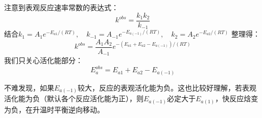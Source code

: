 \begin{example}
注意到表观反应速率常数的表达式：
$$k^{obs} = \frac{k_1 k_2}{k_{-1}}$$
结合$k_1 = A_1 e^{-E_{a1}/(RT)}, \quad k_{-1} = A_{-1} e^{-E_{a(-1)}/(RT)}, \quad k_2 = A_2 e^{-E_{a2}/(RT)} $
整理得：
$$k^{obs} = \frac{A_1 A_2}{A_{-1}} e^{-(E_{a1} + E_{a2} - E_{a(-1)})/(RT)}$$
我们只关心活化能部分：
$$E_a^{obs} = E_{a1} + E_{a2} - E_{a(-1)}$$
\end{example}

不难发现，如果$E_{a(-1)}$较大，反应的表观活化能为负。这也比较好理解，若表观活化能为负（默认各个反应活化能为正），则$E_{a(-1)}$必定大于$E_{a(1)}$，快反应焓变为负，在升温时平衡逆向移动。

\newpage
